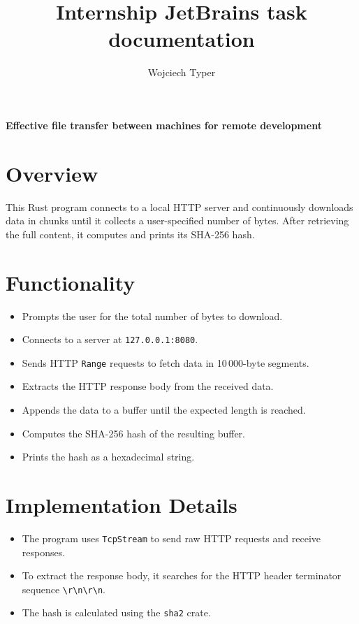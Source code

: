 \documentclass{article}
\title{Internship JetBrains task documentation}
\author{Wojciech Typer}
\date{}
\begin{document}
\maketitle

\textbf{Effective file transfer between machines for remote development}

\section*{Overview}
This Rust program connects to a local HTTP server and continuously downloads data in chunks until it collects a user-specified number of bytes. After retrieving the full content, it computes and prints its SHA-256 hash.

\section*{Functionality}

\begin{itemize}
    \item Prompts the user for the total number of bytes to download.
    \item Connects to a server at \texttt{127.0.0.1:8080}.
    \item Sends HTTP \texttt{Range} requests to fetch data in 10\,000-byte segments.
    \item Extracts the HTTP response body from the received data.
    \item Appends the data to a buffer until the expected length is reached.
    \item Computes the SHA-256 hash of the resulting buffer.
    \item Prints the hash as a hexadecimal string.
\end{itemize}

\section*{Implementation Details}

\begin{itemize}
    \item The program uses \texttt{TcpStream} to send raw HTTP requests and receive responses.
    \item To extract the response body, it searches for the HTTP header terminator sequence \texttt{\textbackslash r\textbackslash n\textbackslash r\textbackslash n}.
    \item The hash is calculated using the \texttt{sha2} crate.
\end{itemize}
\end{document}
